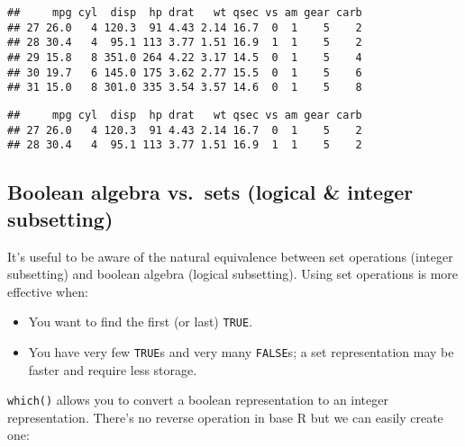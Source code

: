 \begin{verbatim}
##     mpg cyl  disp  hp drat   wt qsec vs am gear carb
## 27 26.0   4 120.3  91 4.43 2.14 16.7  0  1    5    2
## 28 30.4   4  95.1 113 3.77 1.51 16.9  1  1    5    2
## 29 15.8   8 351.0 264 4.22 3.17 14.5  0  1    5    4
## 30 19.7   6 145.0 175 3.62 2.77 15.5  0  1    5    6
## 31 15.0   8 301.0 335 3.54 3.57 14.6  0  1    5    8
\end{verbatim}

\begin{Shaded}
\begin{Highlighting}[]
\OperatorTok{==}\StringTok{ } \OperatorTok{&}\StringTok{ }\OperatorTok{==}\StringTok{ }\NormalTok{)}
\end{Highlighting}
\end{Shaded}

\begin{verbatim}
##     mpg cyl  disp  hp drat   wt qsec vs am gear carb
## 27 26.0   4 120.3  91 4.43 2.14 16.7  0  1    5    2
## 28 30.4   4  95.1 113 3.77 1.51 16.9  1  1    5    2
\end{verbatim}

\hypertarget{boolean-algebra-vs.sets-logical-integer-subsetting}{%
\subsection{Boolean algebra vs.~sets (logical \& integer
subsetting)}\label{boolean-algebra-vs.sets-logical-integer-subsetting}}

It's useful to be aware of the natural equivalence between set
operations (integer subsetting) and boolean algebra (logical
subsetting). Using set operations is more effective when:
 

\begin{itemize}
\item
  You want to find the first (or last) \texttt{TRUE}.
\item
  You have very few \texttt{TRUE}s and very many \texttt{FALSE}s; a set
  representation may be faster and require less storage.
\end{itemize}

\texttt{which()} allows you to convert a boolean representation to an
integer representation. There's no reverse operation in base R but we
can easily create one: 

\begin{Shaded}
\begin{Highlighting}[]
\StringTok{ }\NormalTok{(}\NormalTok{) }\OperatorTok{<}\StringTok{ }
\end{Highlighting}
\end{Shaded}

